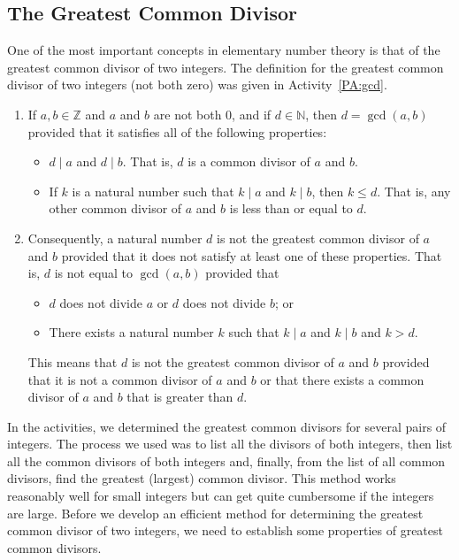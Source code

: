 \subsection*{The Greatest Common Divisor}
One of the most important concepts in elementary number theory is that of the greatest common divisor of two integers.  The definition for the greatest common divisor of two integers (not both zero) was given in \typeu Activity~\ref*{PA:gcd}.

\begin{enumerate}
\item If  $a, b \in \mathbb{Z}$ and $a$ and $b$ are not both 0, and  if  $d \in \mathbb{N}$, then $d = \gcd( {a, b} )$ provided that it satisfies all of the following properties:
\begin{itemize}
\item $d \mid a$  and  $d \mid b$.  That is, $d$  is a common divisor of $a$ and $b$.

\item If  $k$  is a natural number such that  $k \mid a$  and  $k \mid b$, then 
$k \leq d$\!.  That is,  any other common divisor of $a$ and $b$ is less than or equal to $d$\!.
\end{itemize}

\item Consequently, a natural number  $d$  is not the greatest common divisor of  $a$  and  $b$  provided that it does not satisfy at least one of these properties.  That is,  $d$  is not equal to  $\gcd( {a, b} )$
provided that

\begin{itemize}
\item $d$  does not divide  $a$  or $d$  does not divide  $b$; or

\item There exists a natural number $k$  such that  $k \mid a$  and  $k \mid b$  and  $k > d$\!.
\end{itemize}
This means that $d$ is not the greatest common divisor of $a$ and $b$ provided that it is not a common divisor of $a$ and $b$ or that there exists a common divisor of $a$ and $b$ that is greater than $d$\!.
\end{enumerate}
%
In the \typel activities, we determined the greatest common divisors for several pairs of integers.  The process we used was to list all the divisors of both integers, then list all the common divisors of both integers and, finally, from the list of all common divisors, find the greatest (largest) common divisor.  This method works reasonably well for small integers but can get quite cumbersome if the integers are large.  Before we develop an efficient method for determining the greatest common divisor of two integers, we need to establish some properties of greatest common divisors.

